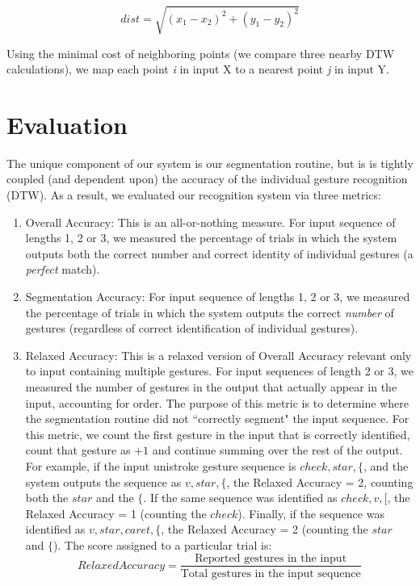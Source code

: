 \documentclass[twoside]{article}
\begin{document}
\begin{multicols}{2}
\[
 dist = \displaystyle\sqrt{(x_1-x_2)^2 + (y_1-y_2)^2}
\]

Using the minimal cost of neighboring points (we compare three nearby DTW calculations),
we map each point \emph{i} in input X to a nearest point \emph{j} in input Y.

\section{Evaluation}


The unique component of our system is our segmentation routine, but is is tightly coupled (and dependent upon) the accuracy of the individual gesture recognition (DTW). As a result, we evaluated our recognition system via three metrics:
\begin{enumerate}
\item Overall Accuracy: This is an all-or-nothing measure. For input sequence of
lengths 1, 2 or 3, we measured the percentage of trials in which the system
outputs both the correct number and correct identity of individual gestures (a \emph{perfect} match).

\item
Segmentation Accuracy: For input sequence of lengths 1, 2 or 3, we measured the
percentage of trials in which the system outputs the correct \emph{number} of
gestures (regardless of correct identification of individual gestures).

\item Relaxed Accuracy: This is a relaxed version of Overall Accuracy relevant
only to input containing multiple gestures. For input sequences of length 2 or 3,
we measured the number of gestures in the output that actually appear in the input, accounting for order.
The purpose of this metric is to determine %
where the segmentation routine did not ``correctly segment" the input sequence.
For this metric, we count the first gesture in the input that is correctly identified, count that gesture as $+1$ and continue
summing over the rest of the output. For example, if the input unistroke gesture sequence is $check, star, \{$, and the system
outputs the sequence as $v, star, \{$, the
Relaxed Accuracy = 2, counting both the $star$ and the $\{$. If the same sequence was identified as $check, v, [$, the Relaxed
Accuracy = 1 (counting the $check$). Finally, if the sequence was identified as $v, star, caret, \{$, the Relaxed Accuracy = 2 (counting the $star$ and $\{$).
The score assigned to a particular trial is:
\[
		Relaxed Accuracy = \frac{\text{Reported gestures in the input}}{\text{Total gestures in the input sequence}}
	\]
\end{enumerate}


\end{multicols}
\end{document}
